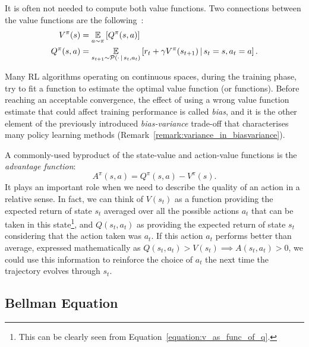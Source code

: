 It is often not needed to compute both value functions.
Two connections between the value functions are the following~\parencite{sutton_reinforcement_2018}:
%
\begin{align}
    V^\pi(s) &= \operatorname*{\mathbb{E}}_{a \sim \pi} \left[ Q^\pi(s, a) \right] \label{equation:v_as_func_of_q}\\
    Q^\pi(s, a) &= \operatorname*{\mathbb{E}}_{s_{t+1} \sim \mathcal{P}(\cdot \operatorname{\mid} s_t, a_t)} \left[ r_t + \gamma V^\pi(s_{t+1}) \operatorname{\mid} s_t=s, a_t=a \right] \label{equation:q_as_func_of_v}
    .
\end{align}

\begin{remark*}
\label{remark:bias_in_biasvariance}
%
Many \ac{RL} algorithms operating on continuous spaces, during the training phase, try to fit a function to estimate the optimal value function (or functions).
Before reaching an acceptable convergence, the effect of using a wrong value function estimate that could affect training performance is called \emph{bias}, and it is the other element of the previously introduced \emph{bias-variance} trade-off that characterises many policy learning methods (Remark~\ref{remark:variance_in_biasvariance}).
%
\end{remark*}

A commonly-used byproduct of the state-value and action-value functions is the \emph{advantage function}:
%
\begin{equation}
    \label{equation:advantage_function}
    A^\pi(s, a) = Q^\pi(s, a) - V^\pi(s) .
\end{equation}
%
It plays an important role when we need to describe the quality of an action in a relative sense.
In fact, we can think of $V(s_t)$ as a function providing the expected return of state $s_t$ averaged over all the possible actions $a_t$ that can be taken in this state\footnote{This can be clearly seen from Equation~\eqref{equation:v_as_func_of_q}.}, and $Q(s_t, a_t)$ as providing the expected return of state $s_t$ considering that the action taken was $a_t$.
If this action $a_t$ performs better than average, expressed mathematically as $Q(s_t, a_t) > V(s_t) \implies A(s_t, a_t) > 0$, we could use this information to reinforce the choice of $a_t$ the next time the trajectory evolves through $s_t$.

\pagebreak
\subsection{Bellman Equation}
\label{section:bellman_equation}

